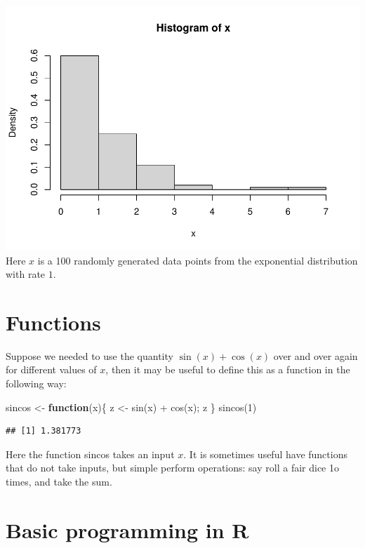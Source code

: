 \documentclass[
]{article}
\newenvironment{Shaded}{\begin{snugshade}}{\end{snugshade}}
\newcommand{\ControlFlowTok}[1]{\textcolor[rgb]{0.13,0.29,0.53}{\textbf{#1}}}
\newcommand{\DecValTok}[1]{\textcolor[rgb]{0.00,0.00,0.81}{#1}}
\newcommand{\FunctionTok}[1]{\textcolor[rgb]{0.00,0.00,0.00}{#1}}
\newcommand{\NormalTok}[1]{#1}
\newcommand{\OtherTok}[1]{\textcolor[rgb]{0.56,0.35,0.01}{#1}}
\newcommand{\SpecialCharTok}[1]{\textcolor[rgb]{0.00,0.00,0.00}{#1}}
\theoremstyle{definition}
\theoremstyle{definition}
\theoremstyle{definition}
\theoremstyle{remark}
\begin{document}
\includegraphics{intro-R_files/figure-latex/unnamed-chunk-8-1.pdf}
Here \(x\) is a 100 randomly generated data points from the exponential distribution with rate \(1\).

\hypertarget{functions}{%
\section{Functions}\label{functions}}

Suppose we needed to use the quantity \(\sin(x) + \cos(x)\) over and over again for different values of \(x\), then it may be useful to define this as a function in the following way:

\begin{Shaded}
\begin{Highlighting}[]
\NormalTok{sincos }\OtherTok{\textless{}{-}} \ControlFlowTok{function}\NormalTok{(x)\{}
\NormalTok{z }\OtherTok{\textless{}{-}} \FunctionTok{sin}\NormalTok{(x) }\SpecialCharTok{+} \FunctionTok{cos}\NormalTok{(x);}
\NormalTok{z}
\NormalTok{\}}
\FunctionTok{sincos}\NormalTok{(}\DecValTok{1}\NormalTok{)}
\end{Highlighting}
\end{Shaded}

\begin{verbatim}
## [1] 1.381773
\end{verbatim}

Here the function sincos takes an input \(x\). It is sometimes useful have functions that do not take inputs, but simple perform operations: say roll a fair dice 1o times, and take the sum.

\hypertarget{basic-programming-in-r}{%
\section{Basic programming in R}\label{basic-programming-in-r}}
\end{document}
